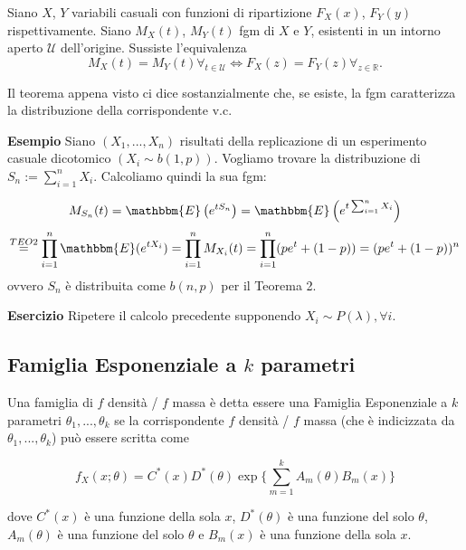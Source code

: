 \begin{thm}
Siano \(X\), \(Y\) variabili casuali con funzioni di ripartizione \(F_X(x)\), \(F_Y(y)\) rispettivamente.
Siano \(M_X(t)\), \(M_Y(t)\) fgm di \(X\) e \(Y\), esistenti in un intorno aperto \(\mathcal{U}\) dell'origine. Sussiste l'equivalenza
\begin{equation}
  M_X(t) = M_Y(t) \forall_{t \in \mathcal{U}} \iff
  F_X(z) = F_Y(z) \forall_{z \in \mathbb{R}}.
\end{equation}
\end{thm}

\begin{oss}
Il teorema appena visto ci dice sostanzialmente che, se esiste, la fgm caratterizza la distribuzione della corrispondente v.c.
\end{oss}
\noindent \textbf{Esempio}
Siano $(X_1,...,X_n)$ risultati della replicazione di un esperimento casuale dicotomico $(X_i \sim b(1,p))$. Vogliamo trovare la distribuzione di $S_n := \displaystyle\sum_{i=1}^n X_i$. Calcoliamo quindi la sua fgm:

$$M_{S_n}(t) = \mathbbm{E} \left( {e^{t S_n}} \right)  = \mathbbm{E} \left( {e^{t \sum_{i=1}^n X_i}} \right) $$
$$\stackrel{TEO 2}
{=} \displaystyle\prod_{i=1}^n \mathbbm{E}({e^{tX_i}}) = \displaystyle\prod_{i=1}^n M_{X_i}(t) = \displaystyle\prod_{i=1}^n (p e^t + (1-p)) = (p e^t + (1-p))^n$$ ovvero $S_n$ è distribuita come $b(n,p)$ per il Teorema 2.

\noindent \textbf{Esercizio}
Ripetere il calcolo precedente supponendo $X_i \sim P(\lambda), \forall i$.

\subsection{Famiglia Esponenziale a $k$ parametri}
Una famiglia di $f$ densità / $f$ massa è detta essere una Famiglia Esponenziale a $k$ parametri $\theta_1,...,\theta_k$ se la corrispondente $f$ densità / $f$ massa (che è indicizzata da $\theta_1,...,\theta_k$) può essere scritta come

$$f_X(x;\theta) = C^*(x) D^*(\theta) \exp \lbrace \displaystyle\sum_{m=1}^k A_m(\theta) B_m (x) \rbrace$$

dove $C^*(x)$ è una funzione della sola $x$, $D^*(\theta)$ è una funzione del solo $\theta$, $A_m(\theta)$ è una funzione del solo $\theta$ e $B_m(x)$ è una funzione della sola $x$.

